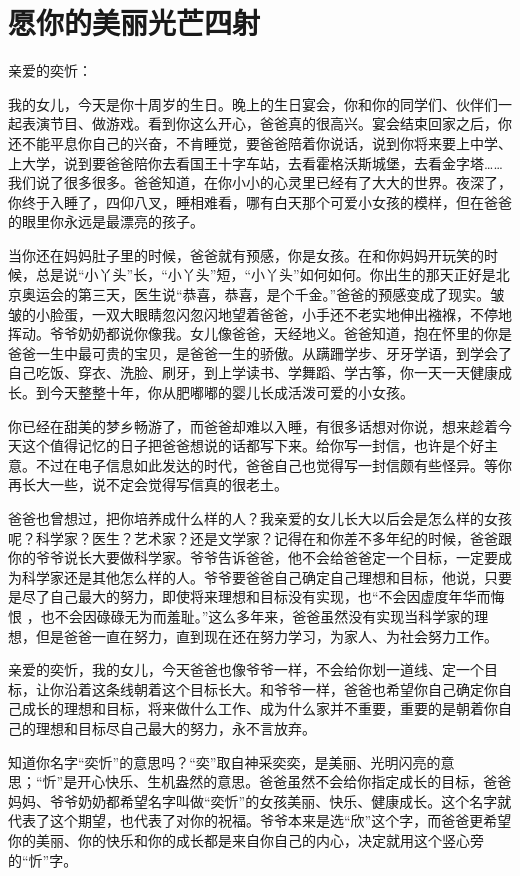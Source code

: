 \section{愿你的美丽光芒四射}

\noindent 亲爱的奕忻：

我的女儿，今天是你十周岁的生日。晚上的生日宴会，你和你的同学们、伙伴们一起表演节目、做游戏。看到你这么开心，爸爸真的很高兴。宴会结束回家之后，你还不能平息你自己的兴奋，不肯睡觉，要爸爸陪着你说话，说到你将来要上中学、上大学，说到要爸爸陪你去看国王十字车站，去看霍格沃斯城堡，去看金字塔……我们说了很多很多。爸爸知道，在你小小的心灵里已经有了大大的世界。夜深了，你终于入睡了，四仰八叉，睡相难看，哪有白天那个可爱小女孩的模样，但在爸爸的眼里你永远是最漂亮的孩子。

当你还在妈妈肚子里的时候，爸爸就有预感，你是女孩。在和你妈妈开玩笑的时候，总是说“小丫头”长，“小丫头”短，“小丫头”如何如何。你出生的那天正好是北京奥运会的第三天，医生说“恭喜，恭喜，是个千金。”爸爸的预感变成了现实。皱皱的小脸蛋，一双大眼睛忽闪忽闪地望着爸爸，小手还不老实地伸出襁褓，不停地挥动。爷爷奶奶都说你像我。女儿像爸爸，天经地义。爸爸知道，抱在怀里的你是爸爸一生中最可贵的宝贝，是爸爸一生的骄傲。从蹒跚学步、牙牙学语，到学会了自己吃饭、穿衣、洗脸、刷牙，到上学读书、学舞蹈、学古筝，你一天一天健康成长。到今天整整十年，你从肥嘟嘟的婴儿长成活泼可爱的小女孩。

你已经在甜美的梦乡畅游了，而爸爸却难以入睡，有很多话想对你说，想来趁着今天这个值得记忆的日子把爸爸想说的话都写下来。给你写一封信，也许是个好主意。不过在电子信息如此发达的时代，爸爸自己也觉得写一封信颇有些怪异。等你再长大一些，说不定会觉得写信真的很老土。

爸爸也曾想过，把你培养成什么样的人？我亲爱的女儿长大以后会是怎么样的女孩呢？科学家？医生？艺术家？还是文学家？记得在和你差不多年纪的时候，爸爸跟你的爷爷说长大要做科学家。爷爷告诉爸爸，他不会给爸爸定一个目标，一定要成为科学家还是其他怎么样的人。爷爷要爸爸自己确定自己理想和目标，他说，只要是尽了自己最大的努力，即使将来理想和目标没有实现，也“不会因虚度年华而悔恨 ，也不会因碌碌无为而羞耻。”这么多年来，爸爸虽然没有实现当科学家的理想，但是爸爸一直在努力，直到现在还在努力学习，为家人、为社会努力工作。

亲爱的奕忻，我的女儿，今天爸爸也像爷爷一样，不会给你划一道线、定一个目标，让你沿着这条线朝着这个目标长大。和爷爷一样，爸爸也希望你自己确定你自己成长的理想和目标，将来做什么工作、成为什么家并不重要，重要的是朝着你自己的理想和目标尽自己最大的努力，永不言放弃。

知道你名字“奕忻”的意思吗？“奕”取自神采奕奕，是美丽、光明闪亮的意思；“忻”是开心快乐、生机盎然的意思。爸爸虽然不会给你指定成长的目标，爸爸妈妈、爷爷奶奶都希望名字叫做“奕忻”的女孩美丽、快乐、健康成长。这个名字就代表了这个期望，也代表了对你的祝福。爷爷本来是选“欣”这个字，而爸爸更希望你的美丽、你的快乐和你的成长都是来自你自己的内心，决定就用这个竖心旁的“忻”字。

